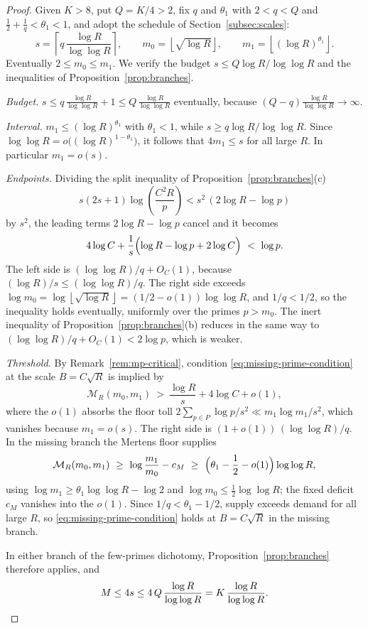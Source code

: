 \documentclass[11pt]{article}
\newcommand{\floor}[1]{\left\lfloor #1 \right\rfloor}
\newcommand{\ceil}[1]{\left\lceil #1 \right\rceil}
\newcommand{\M}{\mathcal M}
\begin{document}
\paramthm*

\begin{proof}
Given \(K>8\), put \(Q=K/4>2\), fix \(q\) and \(\theta_1\) with \(2<q<Q\) and \(\tfrac12+\tfrac1q<\theta_1<1\), and adopt the schedule of Section~\ref{subsec:scales}:
\[
  s=\ceil{q\,\frac{\log R}{\log\log R}},\qquad
  m_0=\floor{\sqrt{\log R}},\qquad
  m_1=\floor{(\log R)^{\theta_1}} .
\]
Eventually \(2\le m_0\le m_1\).
We verify the budget \(s\le Q\log R/\log\log R\) and the inequalities of Proposition~\ref{prop:branches}.

\emph{Budget.}  \(s\le q\,\frac{\log R}{\log\log R}+1\le Q\,\frac{\log R}{\log\log R}\) eventually, because \((Q-q)\frac{\log R}{\log\log R}\to\infty\).

\emph{Interval.}  \(m_1\le (\log R)^{\theta_1}\) with \(\theta_1<1\), while \(s\ge q\log R/\log\log R\).
Since \(\log\log R=o\bigl((\log R)^{1-\theta_1}\bigr)\), it follows that \(4m_1\le s\) for all large \(R\).
In particular \(m_1=o(s)\).

\emph{Endpoints.}  Dividing the split inequality of Proposition~\ref{prop:branches}(c)
\[
  s(2s+1)\log\left(\frac{C^2R}{p}\right)<s^2\,(2\log R-\log p)
\]
by \(s^2\), the leading terms \(2\log R-\log p\) cancel and it becomes
\[
  4\log C+\frac1s\Bigl(\log R-\log p+2\log C\Bigr)\ <\ \log p .
\]
The left side is \((\log\log R)/q+O_C(1)\), because \((\log R)/s\le(\log\log R)/q\).
The right side exceeds \(\log m_0=\log\floor{\sqrt{\log R}}=(1/2-o(1))\log\log R\), and \(1/q<1/2\), so the inequality holds eventually, uniformly over the primes \(p>m_0\).
The inert inequality of Proposition~\ref{prop:branches}(b) reduces in the same way to \((\log\log R)/q+O_C(1)<2\log p\), which is weaker.

\emph{Threshold.}  By Remark~\ref{rem:mp-critical}, condition \eqref{eq:missing-prime-condition} at the scale \(B=C\sqrt R\) is implied by
\[
  \M_R(m_0,m_1)\ >\ \frac{\log R}{s}+4\log C+o(1),
\]
where the \(o(1)\) absorbs the floor toll \(2\sum_{p\in P}\log p/s^2\ll m_1\log m_1/s^2\), which vanishes because \(m_1=o(s)\).
The right side is \((1+o(1))\,(\log\log R)/q\).
In the missing branch the Mertens floor supplies
\[
  \M_R(m_0,m_1)\ \ge\ \log\frac{m_1}{m_0}-c_M
  \ \ge\ \Bigl(\theta_1-\frac12-o(1)\Bigr)\log\log R,
\]
using \(\log m_1\ge\theta_1\log\log R-\log2\) and \(\log m_0\le\tfrac12\log\log R\); the fixed deficit \(c_M\) vanishes into the \(o(1)\).
Since \(1/q<\theta_1-1/2\), supply exceeds demand for all large \(R\), so \eqref{eq:missing-prime-condition} holds at \(B=C\sqrt R\) in the missing branch.

In either branch of the few-primes dichotomy, Proposition~\ref{prop:branches} therefore applies, and
\[
  M\le 4s\le 4\,Q\,\frac{\log R}{\log\log R}=K\,\frac{\log R}{\log\log R}.
  \qedhere
\]
\end{proof}
\end{document}
